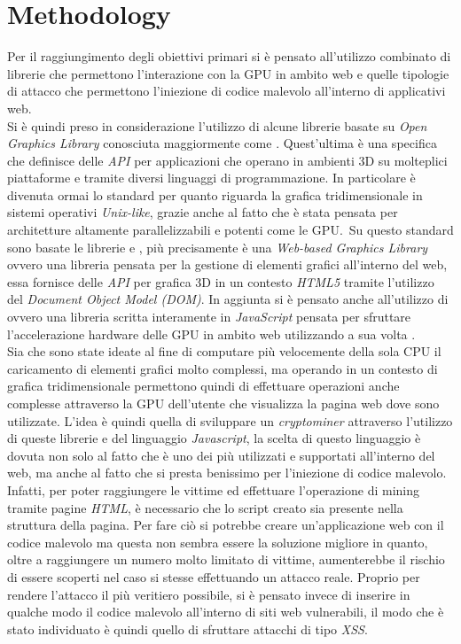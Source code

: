 \documentclass[
11pt, %
oneside, %
italian, %
onehalfspacing,%
headsepline, %
]{MastersDoctoralThesis} %
\newcommand\citetitlen[1]{\citetitle{#1} \citep{#1}}
\begin{document}
{\chapter{Methodology}}
Per il raggiungimento degli obiettivi primari si è pensato all'utilizzo combinato di librerie che permettono l'interazione con la GPU in ambito web e quelle tipologie di attacco che permettono l'iniezione di codice malevolo all'interno di applicativi web.\\
Si è quindi preso in considerazione l'utilizzo di alcune librerie basate su \emph{Open Graphics Library} conosciuta maggiormente come \citetitlen{OpenGL}. Quest'ultima è una specifica che definisce delle \emph{API} per applicazioni che operano in ambienti 3D su molteplici piattaforme e tramite diversi linguaggi di programmazione. In particolare è divenuta ormai lo standard per quanto riguarda la grafica tridimensionale in sistemi operativi \emph{Unix-like}, grazie anche al fatto che è stata pensata per architetture altamente parallelizzabili e potenti come le GPU.\ Su questo standard sono basate le librerie \citetitlen{WebGL} e \citetitlen{GPU.js}, più precisamente  è una \emph{Web-based Graphics Library} ovvero una libreria pensata per la gestione di elementi grafici all'interno del web, essa fornisce delle \emph{API} per grafica 3D in un contesto \emph{HTML5} tramite l'utilizzo del \emph{Document Object Model (DOM)}. In aggiunta si è pensato anche all'utilizzo di  ovvero una libreria scritta interamente in \emph{JavaScript} pensata per sfruttare l'accelerazione hardware delle GPU in ambito web utilizzando a sua volta .\\
Sia  che  sono state ideate al fine di computare più velocemente della sola CPU il caricamento di elementi grafici molto complessi, ma operando in un contesto di grafica tridimensionale permettono quindi di effettuare operazioni anche complesse attraverso la GPU dell'utente che visualizza la pagina web dove sono utilizzate. L'idea è quindi quella di sviluppare un \emph{cryptominer} attraverso l'utilizzo di queste librerie e del linguaggio \emph{Javascript}, la scelta di questo linguaggio è dovuta non solo al fatto che è uno dei più utilizzati e supportati all'interno del web, ma anche al fatto che si presta benissimo per l'iniezione di codice malevolo.\\
Infatti, per poter raggiungere le vittime ed effettuare l'operazione di mining tramite pagine \emph{HTML}, è necessario che lo script creato sia presente nella struttura della pagina. Per fare ciò si potrebbe creare un'applicazione web con il codice malevolo ma questa non sembra essere la soluzione migliore in quanto, oltre a raggiungere un numero molto limitato di vittime, aumenterebbe il rischio di essere scoperti nel caso si stesse effettuando un attacco reale. Proprio per rendere l'attacco il più veritiero possibile, si è pensato invece di inserire in qualche modo il codice malevolo all'interno di siti web vulnerabili, il modo che è stato individuato è quindi quello di sfruttare attacchi di tipo \emph{XSS}.\\
\end{document}
